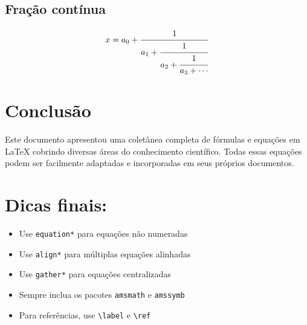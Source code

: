 \subsection{Fração contínua}

\begin{equation}
x = a_0 + \cfrac{1}{a_1 + \cfrac{1}{a_2 + \cfrac{1}{a_3 + \cdots}}}
\end{equation}


\section{Conclusão}

Este documento apresentou uma coletânea completa de fórmulas e equações em LaTeX cobrindo diversas áreas do conhecimento científico. Todas essas equações podem ser facilmente adaptadas e incorporadas em seus próprios documentos.

\section{Dicas finais:}
\begin{itemize}
    \item Use \texttt{equation*} para equações não numeradas
    \item Use \texttt{align*} para múltiplas equações alinhadas
    \item Use \texttt{gather*} para equações centralizadas
    \item Sempre inclua os pacotes \texttt{amsmath} e \texttt{amssymb}
    \item Para referências, use \texttt{\textbackslash label} e \texttt{\textbackslash ref}
\end{itemize}

